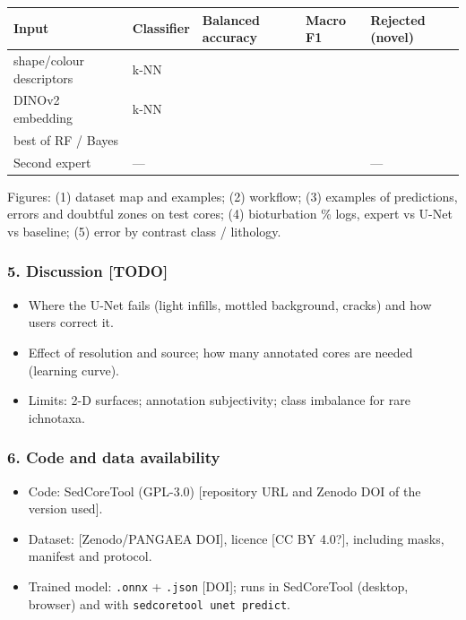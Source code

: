 \documentclass[
  10pt,
]{article}
\providecommand{\tightlist}{%
  \setlength{\itemsep}{0pt}\setlength{\parskip}{0pt}}
\begin{document}
\begin{longtable}[]{@{}lllll@{}}
\toprule\noalign{}
Input & Classifier & Balanced accuracy & Macro F1 & Rejected (novel) \\
\midrule\noalign{}
\endhead
\bottomrule\noalign{}
\endlastfoot
12 shape/colour descriptors & k-NN & & & \\
DINOv2 embedding & k-NN & & & \\
best of RF / Bayes & & & & \\
Second expert & --- & & & --- \\
\end{longtable}

Figures: (1) dataset map and examples; (2) workflow; (3) examples of
predictions, errors and doubtful zones on test cores; (4) bioturbation
\% logs, expert vs U-Net vs baseline; (5) error by contrast class /
lithology.

\hypertarget{discussion-todo}{%
\subsubsection{5. Discussion {[}TODO{]}}\label{discussion-todo}}

\begin{itemize}
\tightlist
\item
  Where the U-Net fails (light infills, mottled background, cracks) and
  how users correct it.
\item
  Effect of resolution and source; how many annotated cores are needed
  (learning curve).
\item
  Limits: 2-D surfaces; annotation subjectivity; class imbalance for
  rare ichnotaxa.
\end{itemize}

\hypertarget{code-and-data-availability}{%
\subsubsection{6. Code and data
availability}\label{code-and-data-availability}}

\begin{itemize}
\tightlist
\item
  Code: SedCoreTool (GPL-3.0) {[}repository URL and Zenodo DOI of the
  version used{]}.
\item
  Dataset: {[}Zenodo/PANGAEA DOI{]}, licence {[}CC BY 4.0?{]}, including
  masks, manifest and protocol.
\item
  Trained model: \texttt{.onnx} + \texttt{.json} {[}DOI{]}; runs in
  SedCoreTool (desktop, browser) and with
  \texttt{sedcoretool\ unet\ predict}.
\end{itemize}
\end{document}
